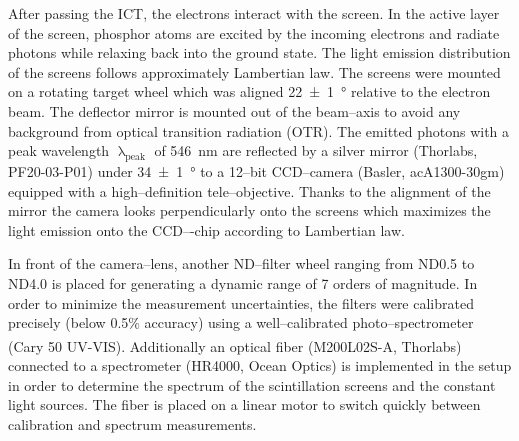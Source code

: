 \documentclass[%
reprint,
amsmath,
amssymb,
aip,
rsi, 
numerical,
floatfix,
]{revtex4-1}
\newcommand{\myCite}[1]{\textcolor{blue}{\cite{#1}}}
\begin{document}
After passing the ICT, the electrons interact with the screen. 
In the active layer of the screen, phosphor atoms are excited by the incoming electrons and radiate photons while relaxing back into the ground state.
The light emission distribution of the screens follows approximately Lambertian law\myCite{Giakoumakis1985}. 
The screens were mounted on a rotating target wheel which was aligned \SI[separate-uncertainty = true]{22(1)}{\degree} relative to the electron beam.
The deflector mirror is mounted out of the beam--axis to avoid any background from optical transition radiation (OTR).  
The emitted photons with a peak wavelength $\uplambda_{\text{peak}}$ of \SI{546}{\nano\metre} are reflected by a silver mirror (Thorlabs, PF20-03-P01) under \SI[separate-uncertainty = true]{34(1)}{\degree} to a 12–bit CCD–camera (Basler, acA1300-30gm) equipped with a high--definition tele--objective. 
Thanks to the alignment of the mirror the camera looks perpendicularly onto the screens which maximizes the light emission onto the CCD–-chip according to Lambertian law.
 
In front of the camera--lens, another ND--filter wheel ranging from ND0.5 to ND4.0 is placed for generating a dynamic range of 7 orders of magnitude. 
In order to minimize the measurement uncertainties, the filters were calibrated precisely (below 0.5$\%$ accuracy) using a well--calibrated photo--spectrometer (Cary\textsuperscript{\textregistered} 50 UV-VIS).
Additionally an optical fiber (M200L02S-A, Thorlabs) connected to a spectrometer (HR4000, Ocean Optics) is implemented in the setup in order to determine the spectrum of the scintillation screens and the constant light sources.
The fiber is placed on a linear motor to switch quickly between calibration and spectrum measurements. 
 
\end{document}
